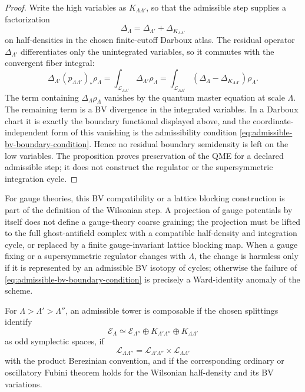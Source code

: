 \begin{proof}
Write the high variables as \(K_{\Lambda\Lambda'}\), so that the admissible
step supplies a factorization
\[
  \Delta_\Lambda
  =
  \Delta_{\Lambda'}+\Delta_{K_{\Lambda\Lambda'}}
\]
on half-densities in the chosen finite-cutoff Darboux atlas.  The residual
operator \(\Delta_{\Lambda'}\) differentiates only the unintegrated variables,
so it commutes with the convergent fiber integral:
\[
  \Delta_{\Lambda'}(p_{\Lambda\Lambda'})_*\rho_\Lambda
  =
  \int_{\mathcal L_{\Lambda\Lambda'}}
  \Delta_{\Lambda'}\rho_\Lambda
  =
  \int_{\mathcal L_{\Lambda\Lambda'}}
  \left(\Delta_\Lambda-\Delta_{K_{\Lambda\Lambda'}}\right)\rho_\Lambda .
\]
The term containing \(\Delta_\Lambda\rho_\Lambda\) vanishes by the quantum
master equation at scale \(\Lambda\).  The remaining term is a BV divergence
in the integrated variables.  In a Darboux chart it is exactly the boundary
functional displayed above, and the coordinate-independent form of this
vanishing is the admissibility condition
\eqref{eq:admissible-bv-boundary-condition}.  Hence no residual boundary
semidensity is left on the low variables.  The proposition proves preservation
of the QME for a declared admissible step; it does not construct the regulator
or the supersymmetric integration cycle.
\end{proof}

For gauge theories, this BV compatibility or a lattice blocking construction
is part of the definition of the Wilsonian step.  A projection of gauge
potentials by itself does not define a gauge-theory coarse graining; the
projection must be lifted to the full ghost-antifield complex with a
compatible half-density and integration cycle, or replaced by a finite
gauge-invariant lattice blocking map.  When a gauge fixing or a
supersymmetric regulator changes with \(\Lambda\), the change is harmless
only if it is represented by an admissible BV isotopy of cycles; otherwise
the failure of \eqref{eq:admissible-bv-boundary-condition} is precisely a
Ward-identity anomaly of the scheme.

\begin{definition}
\label{def:composable-bv-wilsonian-tower}
For \(\Lambda>\Lambda'>\Lambda''\), an admissible tower is composable if the
chosen splittings identify
\[
  \mathcal E_\Lambda
  \simeq
  \mathcal E_{\Lambda''}
  \oplus K_{\Lambda'\Lambda''}
  \oplus K_{\Lambda\Lambda'}
\]
as odd symplectic spaces, if
\[
  \mathcal L_{\Lambda\Lambda''}
  =
  \mathcal L_{\Lambda'\Lambda''}
  \times
  \mathcal L_{\Lambda\Lambda'}
\]
with the product Berezinian convention, and if the corresponding ordinary
or oscillatory Fubini theorem holds for the Wilsonian half-density and its
BV variations.
\end{definition}

